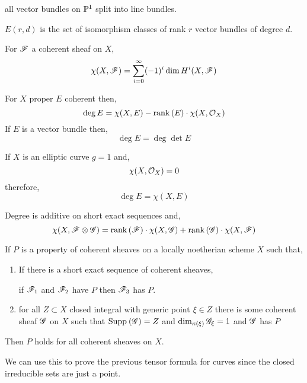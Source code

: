 \documentclass[12pt]{article}
\begin{document}
\begin{thm}
all vector bundles on $\P^1$ split into line bundles.
\end{thm}

\begin{defn}
$E(r,d)$ is the set of isomorphism classes of rank $r$ vector bundles of degree $d$.
\end{defn}

\begin{defn}
For $\F$ a coherent sheaf on $X$,
\[ \chi(X, \F) = \sum_{i = 0}^\infty (-1)^i \dim{H^i(X, \F)} \]
\end{defn}

\begin{defn}
For $X$ proper $E$ coherent then,
\[ \deg{E} = \chi(X, E) - \rank{(E)} \cdot \chi(X, \struct{X}) \]
If $E$ is a vector bundle then,
\[ \deg{E} = \deg{\det{E}} \]
\end{defn}

\begin{rmk}
If $X$ is an elliptic curve $g = 1$ and,
\[ \chi(X, \struct{X}) = 0 \]
therefore,
\[ \deg{E} = \chi(X, E) \]
\end{rmk}

\begin{prop}
Degree is additive on short exact sequences and,
\[ \chi(X, \F \ot \G) = \rank{(\F)} \cdot \chi(X, \G) + \rank{(\G)} \cdot \chi(X, \F) \]
\end{prop}

\begin{thm}[Devissage]
If $P$ is a property of coherent sheaves on a locally noetherian scheme $X$ such that,
\begin{enumerate}
\item If there is a short exact sequence of coherent sheaves,
\begin{center}
\end{center}
if $\F_1$ and $\F_2$ have $P$ then $\F_3$ has $P$.
\item for all $Z \subset X$ closed integral with generic point $\xi \in Z$ there is some coherent sheaf $\G$ on $X$ such that $\Supp{}{\G} = Z$ and $\dim_{\kappa(\xi)} \G_\xi = 1$ and $\G$ has $P$
\end{enumerate}
Then $P$ holds for all coherent sheaves on $X$.
\end{thm}

\begin{rmk}
We can use this to prove the previous tensor formula for curves since the closed irreducible sets are just a point. 
\end{rmk}
\end{document}
